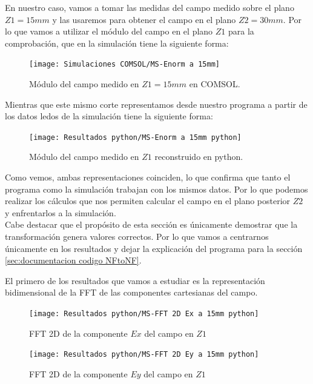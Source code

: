 \documentclass{article}
\begin{document}
En nuestro caso, vamos a tomar las medidas del campo medido sobre el plano $Z1=15mm$ y las usaremos para obtener el campo en el plano $Z2=30mm$. Por lo que vamos a utilizar el módulo del campo en el plano $Z1$ para la comprobación, que en la simulación tiene la siguiente forma:

\begin{figure}[h] 
  \centering
    \texttt{[image: Simulaciones COMSOL/MS-Enorm a 15mm]}
    \caption{Módulo del campo medido en $Z1=15mm$ en COMSOL.}
    \label{MS-Diagrama de radiación de la antena simulada}
\end{figure}
\newpage

Mientras que este mismo corte representamos desde nuestro programa a partir de los datos ledos de la simulación tiene la siguiente forma:

\begin{figure}[h] 
  \centering
    \texttt{[image: Resultados python/MS-Enorm a 15mm python]}
    \caption{Módulo del campo medido en $Z1$ reconstruido en python.}
    \label{MS-Diagrama de radiación de la antena simulada}
\end{figure}

Como vemos, ambas representaciones coinciden, lo que confirma que tanto el programa como la simulación trabajan con los mismos datos. Por lo que podemos realizar los cálculos que nos permiten calcular el campo en el plano posterior $Z2$ y enfrentarlos a la simulación.
\\

Cabe destacar que el propósito de esta sección es únicamente demostrar que la transformación genera valores correctos. Por lo que vamos a centrarnos únicamente en los resultados y dejar la explicación del programa para la sección \ref{sec:documentacion codigo NFtoNF}.

\newpage

El primero de los resultados que vamos a estudiar es la representación bidimensional de la FFT de las componentes cartesianas del campo. 

\begin{figure}[h] 
  \centering
    \texttt{[image: Resultados python/MS-FFT 2D Ex a 15mm python]}
    \caption{FFT 2D de la componente $Ex$ del campo en $Z1$}
    \label{FFT 2D Ex a 15mm}
\end{figure}

\begin{figure}[h] 
  \centering
    \texttt{[image: Resultados python/MS-FFT 2D Ey a 15mm python]}
    \caption{FFT 2D de la componente $Ey$ del campo en $Z1$}
    \label{FFT 2D Ey a 15mm}
\end{figure}
\end{document}

